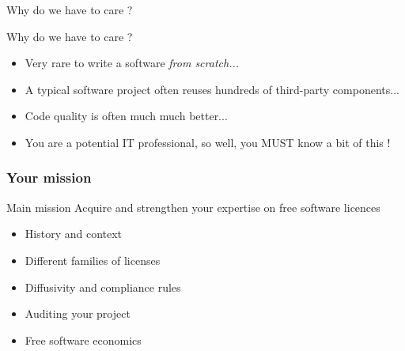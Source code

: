 \documentclass{beamer}
\begin{document}
\begin{frame}[plain]%
%  
\end{frame}

\begin{frame}{Why do we have to care ?}
  \begin{alertblock}{Why do we have to care ?}
    \begin{itemize}
    \item Very rare to write a software \emph{from scratch...}
    \item A typical software project often reuses hundreds of
      third-party components...
    \item Code quality is often much much better...
    \item You are a potential IT professional, so well, you MUST know a bit of this !
    \end{itemize}

\end{alertblock}
\end{frame}


\begin{frame}
\frametitle{Your mission}
\begin{alertblock}{Main mission}
  Acquire and strengthen your expertise on free software licences
\end{alertblock}


  \begin{itemize}
  \item History and context
  \item Different families of licenses
  \item Diffusivity and compliance rules
  \item Auditing your project
  \item Free software economics
  \end{itemize}
\end{frame}
\end{document}
